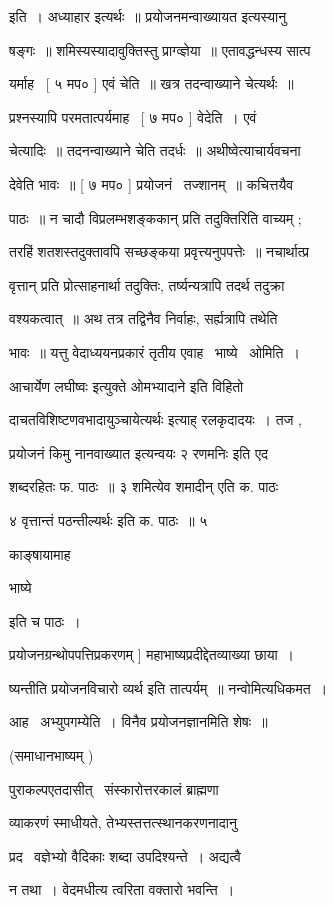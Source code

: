 \documentclass[11pt, openany]{book}
\begin{document}
इति~। अध्याहार इत्यर्थः~॥ प्रयोजनमन्वाख्यायत इत्यस्यानु \textendash\ 

षङ्गः~॥ शमिस्यस्यादावुक्तिस्तु प्राग्व्ज्ञेया~॥ एतावद्धन्धस्य सात्प \textendash\ 


यर्माह \textendash\ [ ५ मप० ] एवं चेति~॥ खत्र तदन्वाख्याने चेत्यर्थः~॥ 

प्रश्नस्यापि परमतात्पर्यमाह \textendash\ [ ७ मप० ] वेदेति~। एवं 

चेत्यादिः~॥ तदनन्वाख्याने चेति तदर्धः~॥ अथीष्वेत्याचार्यवचना \textendash\ 

देवेति भावः~॥ [ ७ मप० ] प्रयोजनं \textendash\ तज्शानम्~॥ कचित्तयैव 

पाठः~॥ न चादौ विप्रलम्भशङ्ककान् प्रति तदुक्तिरिति वाच्यम् ; 

तरहिं शतशस्तदुक्तावपि सच्छङ्कया प्रवृत्त्यनुपपत्तेः~॥ नचार्थात्प्र \textendash\ 

वृत्तान् प्रति प्रोत्साहनार्था तदुक्तिः, तर्ष्यन्यत्रापि तदर्थ तदुक्रा \textendash\ 


वश्यकत्वात्~॥ अथ तत्र तद्विनैव निर्वाहः, सर्ह्यत्रापि तथेति 

भावः~॥ यत्तु वेदाध्ययनप्रकारं तृतीय एवाह \textendash\ भाष्ये \textendash\ ओमिति~। 

आचार्येण {\qt लघीष्वः इत्युक्ते ओमभ्यादाने} इति विहितो \textendash\ 

दाचतविशिष्टणवभादायुञ्चायेत्यर्थः इत्याह् रलकृदादयः~। तज , 

प्रयोजनं किमु नानवाख्यात इत्यन्वयः २ रणमनिः इति एद \textendash\ 

शब्दरहितः फ. पाठः~॥ ३ {\qt शमित्येव शमादीन्} एति क. पाठः 

४ {\qt वृत्तान्तं पठन्तील्यर्थः} इति क. पाठः~॥ ५ {\qt काङ्षायामाह 

भाष्ये} इति च पाठः~। 

प्रयोजनग्रन्थोपपत्तिप्रकरणम् ] महाभाष्यप्रदीद्देतव्याख्या छाया~। 

ष्यन्तीति प्रयोजनविचारो व्यर्थ इति तात्पर्यम्~॥ नन्वोमित्यधिकमत~। 

आह \textendash\ अभ्युपगम्येति~। विनैव प्रयोजनज्ञानमिति शेषः~॥ 

(समाधानभाष्यम् ) 

पुराकल्पएतदासीत् \textendash\ संस्कारोत्तरकालं ब्राह्मणा 

व्याकरणं स्माधीयते, तेभ्यस्तत्तत्स्थानकरणनादानु \textendash\ 

प्रद \textendash\ वज्ञेभ्यो वैदिकाः शब्दा उपदिश्यन्ते~। अद्यत्वै 

न तथा~। वेदमधीत्य त्वरिता वक्तारो भवन्ति~। 
\end{document}
